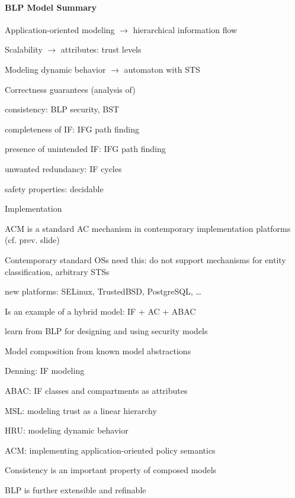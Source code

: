 \documentclass[a4paper]{article}
\begin{document}
\begin{multicols}{3}
    \paragraph{BLP Model Summary}
    \begin{itemize*}
        \item Application-oriented modeling $\rightarrow$ hierarchical information flow
        \item Scalability $\rightarrow$ attributes: trust levels
        \item Modeling dynamic behavior $\rightarrow$ automaton with STS
        \item Correctness guarantees (analysis of)
        \begin{itemize*}
            \item consistency: BLP security, BST
            \item completeness of IF: IFG path finding
            \item presence of unintended IF: IFG path finding
            \item unwanted redundancy: IF cycles
            \item safety properties: decidable
        \end{itemize*}
        \item Implementation
        \begin{itemize*}
            \item ACM is a standard AC mechanism in contemporary implementation platforms (cf. prev. slide)
            \item Contemporary standard OSs need this: do not support mechanisms for entity classification, arbitrary STSs
            \item new platforms: SELinux, TrustedBSD, PostgreSQL, \dots
        \end{itemize*}
        \item Is an example of a hybrid model: IF + AC + ABAC
    \end{itemize*}

    learn from BLP for designing and using security models
    \begin{itemize*}
        \item Model composition from known model abstractions
        \begin{itemize*}
            \item Denning: IF modeling
            \item ABAC: IF classes and compartments as attributes
            \item MSL: modeling trust as a linear hierarchy
            \item HRU: modeling dynamic behavior
            \item ACM: implementing application-oriented policy semantics
        \end{itemize*}
        \item Consistency is an important property of composed models
        \item BLP is further extensible and refinable
    \end{itemize*}


\end{multicols}
\end{document}
